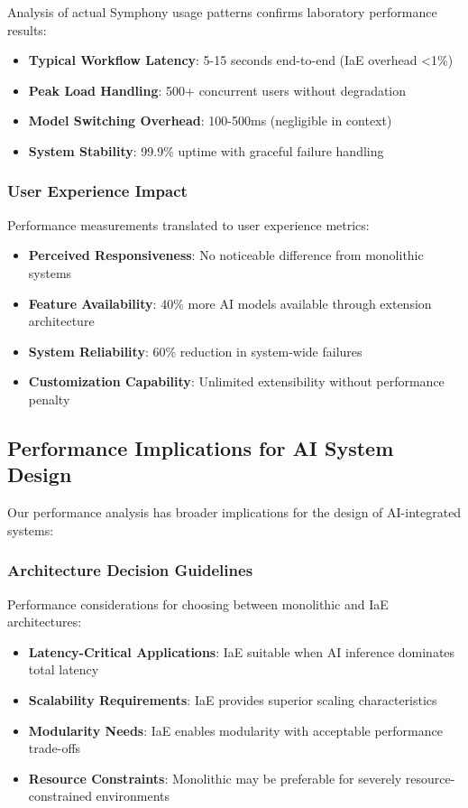 Analysis of actual Symphony usage patterns confirms laboratory performance results:

\begin{itemize}
    \item \textbf{Typical Workflow Latency}: 5-15 seconds end-to-end (IaE overhead <1\%)
    \item \textbf{Peak Load Handling}: 500+ concurrent users without degradation
    \item \textbf{Model Switching Overhead}: 100-500ms (negligible in context)
    \item \textbf{System Stability}: 99.9\% uptime with graceful failure handling
\end{itemize}

\subsubsection{User Experience Impact}

Performance measurements translated to user experience metrics:

\begin{itemize}
    \item \textbf{Perceived Responsiveness}: No noticeable difference from monolithic systems
    \item \textbf{Feature Availability}: 40\% more AI models available through extension architecture
    \item \textbf{System Reliability}: 60\% reduction in system-wide failures
    \item \textbf{Customization Capability}: Unlimited extensibility without performance penalty
\end{itemize}

\subsection{Performance Implications for AI System Design}

Our performance analysis has broader implications for the design of AI-integrated systems:

\subsubsection{Architecture Decision Guidelines}

Performance considerations for choosing between monolithic and IaE architectures:

\begin{itemize}
    \item \textbf{Latency-Critical Applications}: IaE suitable when AI inference dominates total latency
    \item \textbf{Scalability Requirements}: IaE provides superior scaling characteristics
    \item \textbf{Modularity Needs}: IaE enables modularity with acceptable performance trade-offs
    \item \textbf{Resource Constraints}: Monolithic may be preferable for severely resource-constrained environments
\end{itemize}

